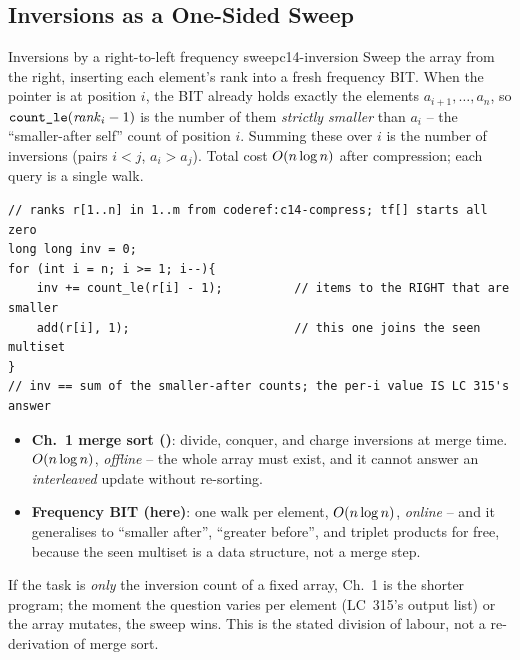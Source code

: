 \subsection{Inversions as a One-Sided Sweep}

\begin{proposition}{Inversions by a right-to-left frequency sweep}{c14-inversion}
Sweep the array from the right, inserting each element's rank into a fresh
frequency BIT.  When the pointer is at position \(i\), the BIT already holds
exactly the elements \(a_{i+1},\dots,a_n\), so
\(\texttt{count\_le}(\mathit{rank}_i-1)\) is the number of them \emph{strictly
smaller} than \(a_i\) -- the ``smaller-after self'' count of position \(i\).
Summing these over \(i\) is the number of inversions (pairs \(i<j\),
\(a_i>a_j\)).  Total cost \(O(n\log n)\) after compression; each query is
a single walk.
\end{proposition}

\begin{lstlisting}[caption={inversion / smaller-after count: one right-to-left sweep}, label={lst:c14-inv}]
// ranks r[1..n] in 1..m from coderef:c14-compress; tf[] starts all zero
long long inv = 0;
for (int i = n; i >= 1; i--){
    inv += count_le(r[i] - 1);          // items to the RIGHT that are smaller
    add(r[i], 1);                       // this one joins the seen multiset
}
// inv == sum of the smaller-after counts; the per-i value IS LC 315's answer
\end{lstlisting}

\begin{comparisonbox}
\begin{itemize}[nosep,leftmargin=1.4em]
  \item \textbf{Ch.~1 merge sort ()}: divide, conquer, and charge
        inversions at merge time.  \(O(n\log n)\), \emph{offline} -- the
        whole array must exist, and it cannot answer an \emph{interleaved}
        update without re-sorting.
  \item \textbf{Frequency BIT (here)}: one walk per element, \(O(n\log
        n)\), \emph{online} -- and it generalises to ``smaller after'',
        ``greater before'', and triplet products for free, because the seen
        multiset is a data structure, not a merge step.
\end{itemize}
If the task is \emph{only} the inversion count of a fixed array, Ch.~1 is the
shorter program; the moment the question varies per element (LC~315's output
list) or the array mutates, the sweep wins.  This is the stated division of
labour, not a re-derivation of merge sort.
\end{comparisonbox}

